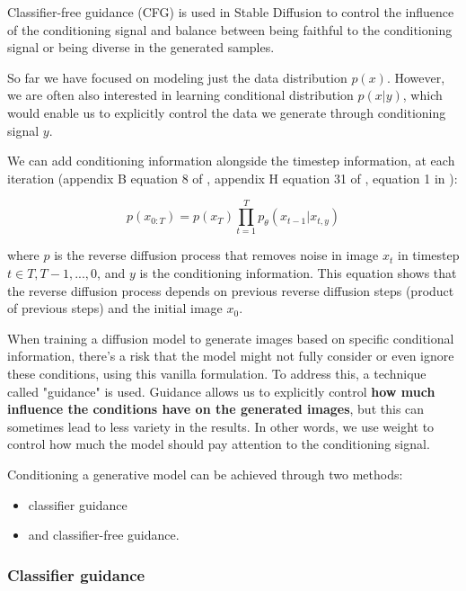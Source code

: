 \label{subsec:classifier_free_diffusion_guidance}

Classifier-free guidance (CFG) is used in Stable Diffusion to control the influence of the conditioning signal and balance between being faithful to the conditioning signal or being diverse in the generated samples.

So far we have focused on modeling just the data distribution $p(x)$. However, we are often also interested in learning conditional distribution $p(x|y)$, which would enable us to explicitly control the data we generate through conditioning signal $y$.

We can add conditioning information alongside the timestep information, at each iteration (appendix B equation 8 of \cite{ddpm}, appendix H equation 31 of \cite{openai_diffusion_beats_gans}, equation 1 in \cite{ddim}):

\[
p(x_{0:T}) = p(x_T) \prod_{t=1}^{T} p_\theta (x_{t-1} | x_{t, y})
\]

where $p$ is the reverse diffusion process that removes noise in image $x_t$ in timestep $t \in {T, T-1, ..., 0}$, and $y$ is the conditioning information. This equation shows that the reverse diffusion process depends on previous reverse diffusion steps (product of previous steps) and the initial image $x_0$.

When training a diffusion model to generate images based on specific conditional information, there's a risk that the model might not fully consider or even ignore these conditions, using this vanilla formulation. To address this, a technique called "guidance" is used. Guidance allows us to explicitly control \textbf{how much influence the conditions have on the generated images}, but this can sometimes lead to less variety in the results. In other words, we use weight to control how much the model should pay attention to the conditioning signal.


Conditioning a generative model can be achieved through two methods: 

\begin{itemize}
    \item classifier guidance
    \item and classifier-free guidance.
\end{itemize}





\subsubsection*{Classifier guidance}

